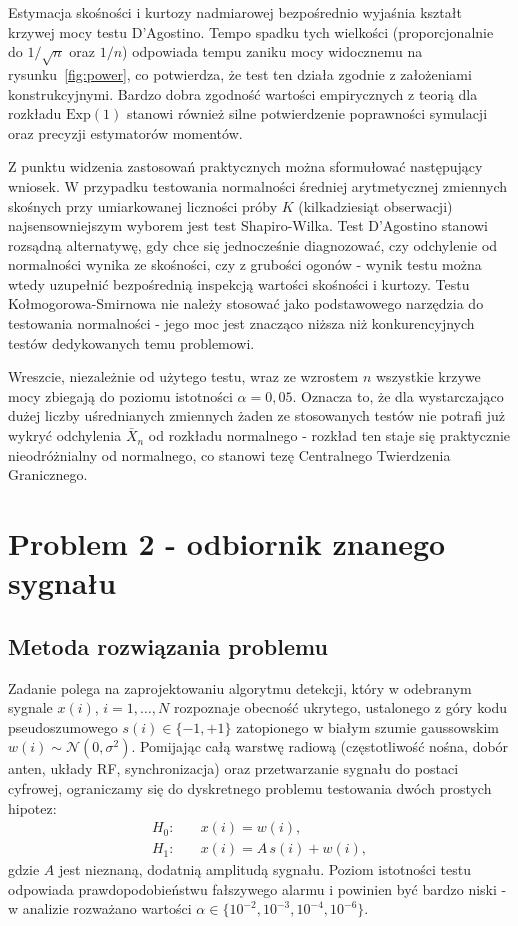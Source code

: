 \documentclass[12pt,a4paper]{article}
\begin{document}
Estymacja skośności i kurtozy nadmiarowej bezpośrednio wyjaśnia kształt krzywej mocy testu D'Agostino. Tempo spadku tych wielkości (proporcjonalnie do $1/\sqrt{n}$ oraz $1/n$) odpowiada tempu zaniku mocy widocznemu na rysunku~\ref{fig:power}, co potwierdza, że test ten działa zgodnie z założeniami konstrukcyjnymi. Bardzo dobra zgodność wartości empirycznych z teorią dla rozkładu $\mathrm{Exp}(1)$ stanowi również silne potwierdzenie poprawności symulacji oraz precyzji estymatorów momentów.

Z punktu widzenia zastosowań praktycznych można sformułować następujący wniosek. W przypadku testowania normalności średniej arytmetycznej zmiennych skośnych przy umiarkowanej liczności próby $K$ (kilkadziesiąt obserwacji) najsensowniejszym wyborem jest test Shapiro-Wilka. Test D'Agostino stanowi rozsądną alternatywę, gdy chce się jednocześnie diagnozować, czy odchylenie od normalności wynika ze skośności, czy z grubości ogonów - wynik testu można wtedy uzupełnić bezpośrednią inspekcją wartości skośności i kurtozy. Testu Kołmogorowa-Smirnowa nie należy stosować jako podstawowego narzędzia do testowania normalności - jego moc jest znacząco niższa niż konkurencyjnych testów dedykowanych temu problemowi.

Wreszcie, niezależnie od użytego testu, wraz ze wzrostem $n$ wszystkie krzywe mocy zbiegają do poziomu istotności $\alpha = 0{,}05$. Oznacza to, że dla wystarczająco dużej liczby uśrednianych zmiennych żaden ze stosowanych testów nie potrafi już wykryć odchylenia $\bar{X}_n$ od rozkładu normalnego - rozkład ten staje się praktycznie nieodróżnialny od normalnego, co stanowi tezę Centralnego Twierdzenia Granicznego.

\section{Problem 2 - odbiornik znanego sygnału}

\subsection{Metoda rozwiązania problemu}

Zadanie polega na zaprojektowaniu algorytmu detekcji, który w odebranym sygnale $x(i)$, $i = 1, \dots, N$ rozpoznaje obecność ukrytego, ustalonego z góry kodu pseudoszumowego $s(i) \in \{-1, +1\}$ zatopionego w białym szumie gaussowskim $w(i) \sim \mathcal{N}(0, \sigma^2)$. Pomijając całą warstwę radiową (częstotliwość nośna, dobór anten, układy RF, synchronizacja) oraz przetwarzanie sygnału do postaci cyfrowej, ograniczamy się do dyskretnego problemu testowania dwóch prostych hipotez:
\begin{align}
    H_0 \!:& \quad x(i) = w(i), \\
    H_1 \!:& \quad x(i) = A\,s(i) + w(i),
\end{align}
gdzie $A$ jest nieznaną, dodatnią amplitudą sygnału. Poziom istotności testu odpowiada prawdopodobieństwu fałszywego alarmu i powinien być bardzo niski - w analizie rozważano wartości $\alpha \in \{10^{-2}, 10^{-3}, 10^{-4}, 10^{-6}\}$.
\end{document}
